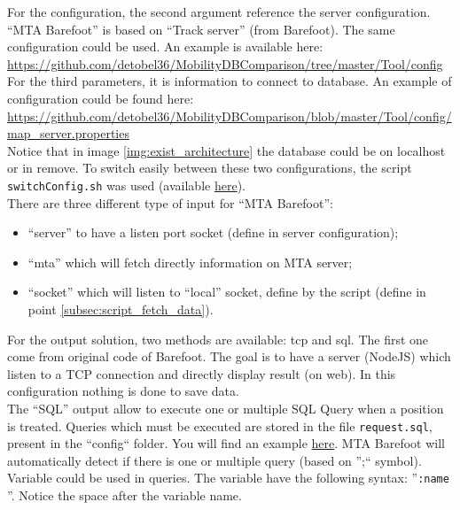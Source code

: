 \documentclass[a4paper,12pt]{article}
\begin{document}
            For the configuration, the second argument reference the server configuration. ``MTA Barefoot'' is based on ``Track server'' (from Barefoot). The same configuration could be used. An example is available here: \url{https://github.com/detobel36/MobilityDBComparison/tree/master/Tool/config}\\
            
            For the third parameters, it is information to connect to database. An example of configuration could be found here: \url{https://github.com/detobel36/MobilityDBComparison/blob/master/Tool/config/map_server.properties}\\
            Notice that in image \ref{img:exist_architecture} the database could be on localhost or in remove. To switch easily between these two configurations, the script \verb|switchConfig.sh| was used (available \href{https://github.com/detobel36/MobilityDBComparison/blob/master/Tool/switchConfig.sh}{here}).\\
            
            There are three different type of input for ``MTA Barefoot'':
            \begin{itemize}
                \item ``server'' to have a listen port socket (define in server configuration);
                \item ``mta'' which will fetch directly information on MTA server;
                \item ``socket'' which will listen to ``local'' socket, define by the script (define in point \ref{subsec:script_fetch_data}).
            \end{itemize}
            
            For the output solution, two methods are available: tcp and sql. The first one come from original code of Barefoot. The goal is to have a server (NodeJS) which listen to a TCP connection and directly display result (on web). In this configuration nothing is done to save data.\\
            The ``SQL'' output allow to execute one or multiple SQL Query when a position is treated. Queries which must be executed are stored in the file \verb|request.sql|, present in the ``config`` folder. You will find an example \href{https://github.com/detobel36/MobilityDBComparison/blob/master/Tool/config/request.sql}{here}. MTA Barefoot will automatically detect if there is one or multiple query (based on '';`` symbol).\\
            Variable could be used in queries. The variable have the following syntax: ''\verb|:name |''. Notice the space after the variable name.\\
            
\end{document}
